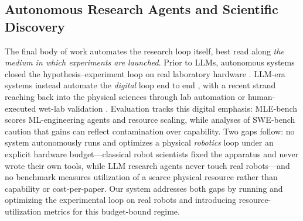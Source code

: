 \subsection{Autonomous Research Agents and Scientific Discovery}
\label{sec:related-research} The final body of work automates the research loop itself, best read along \emph{the medium in which experiments are launched}. Prior to LLMs, autonomous systems closed the hypothesis--experiment loop on real laboratory hardware \citep{king2004functional, burger2020mobile}. LLM-era systems instead automate the \emph{digital} loop end to end \citep{lu2024aiscientist, yamada2025aiscientistv2, schmidgall2025agentlab, schmidgall2025agentrxiv}, with a recent strand reaching back into the physical sciences through lab automation \citep{boiko2023autonomous, m2024augmenting} or human-executed wet-lab validation \citep{ghareeb2025robin}. Evaluation tracks this digital emphasis: MLE-bench \citep{chan2025mle} scores ML-engineering agents and resource scaling, while analyses of SWE-bench \citep{jimenez2024swebench} caution that gains can reflect contamination over capability. Two gaps follow: no system autonomously runs and optimizes a physical \emph{robotics} loop under an explicit hardware budget---classical robot scientists fixed the apparatus and never wrote their own tools, while LLM research agents never touch real robots---and no benchmark measures utilization of a scarce physical resource rather than capability or cost-per-paper. Our system addresses both gaps by running and optimizing the experimental loop on real robots and introducing resource-utilization metrics for this budget-bound regime.





